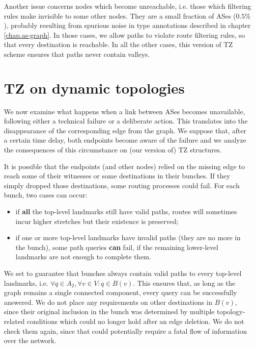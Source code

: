 \documentclass[a4paper,11pt,oneside]{report}
\begin{document}
Another issue concerns nodes which become unreachable, i.e. those which filtering rules make invisible to some other nodes. They are a small fraction of ASes ($0.5\%$), probably resulting from spurious noise in type annotations described in chapter \ref{chap.as-graph}. In those cases, we allow paths to violate route filtering rules, so that every destination is reachable.
In all the other cases, this version of TZ scheme ensures that paths never contain valleys.

\chapter{TZ on dynamic topologies}
\label{chap.dyn_topology}

We now examine what happens when a link between ASes becomes unavailable, following either a technical failure or a deliberate action. This translates into the disappearance of the corresponding edge from the graph. We suppose that, after a certain time delay, both endpoints become aware of the failure and we analyze the consequences of this circumstance on (our version of) TZ structures.

\bigskip
It is possible that the endpoints (and other nodes) relied on the missing edge to reach some of their witnesses or some destinations in their bunches. If they simply dropped those destinations, some routing processes could fail.
For each bunch, two cases can occur:
\begin{itemize}
\item if \textbf{all} the top-level landmarks still have valid paths, routes will sometimes incur higher stretches but their existence is preserved;
\item if one or more top-level landmarks have invalid paths (they are no more in the bunch), some path queries \textbf{can} fail, if the remaining lower-level landmarks are not enough to complete them.
\end{itemize}
We set to guarantee that bunches always contain valid paths to every top-level landmarks, i.e. $\forall q \in A_2, \forall v \in V:q \in B(v)$. This ensures that, as long as the graph remains a single connected component, every query can be successfully answered. We do not place any requirements on other destinations in $B(v)$, since their original inclusion in the bunch was determined by multiple topology-related conditions which could no longer hold after an edge deletion. We do not check them again, since that could potentially require a fatal flow of information over the network.
\end{document}
